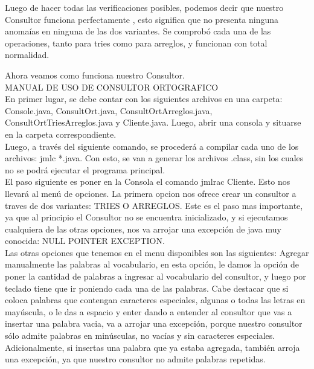 \documentclass{article}
\begin{document}
{	Luego de hacer todas las verificaciones posibles, podemos decir que nuestro Consultor funciona perfectamente , esto significa que no presenta ninguna anoma\'ias en ninguna de las dos variantes. Se comprob\'o cada una de las operaciones, tanto para tries como para arreglos, y funcionan con total normalidad.

Ahora veamos como funciona nuestro Consultor.\\

MANUAL DE USO DE CONSULTOR ORTOGRAFICO \\

    En primer lugar, se debe contar con los siguientes archivos en una carpeta: Console.java, ConsultOrt.java, ConsultOrtArreglos.java, ConsultOrtTriesArreglos.java y Cliente.java. Luego, abrir una consola y situarse en la carpeta correspondiente.\\

    Luego, a trav\'es del siguiente comando, se proceder\'a a compilar cada uno de los archivos: jmlc *.java. Con esto, se van a generar los archivos .class, sin los cuales no se podr\'a ejecutar el programa principal.\\

    El paso siguiente es poner en la Consola el comando jmlrac Cliente. Esto nos llevar\'a al men\'u de opciones. La primera opcion nos ofrece crear un consultor a traves de dos variantes: TRIES O ARREGLOS. Este es el paso mas importante, ya que al principio el Consultor no se encuentra inicializado, y si ejecutamos cualquiera de las otras opciones, nos va arrojar una excepci\'on de java muy conocida: NULL POINTER EXCEPTION.\\

    Las otras opciones que tenemos en el menu disponibles son las siguientes: Agregar manualmente las palabras al vocabulario, en esta opci\'on, le damos la opci\'on de poner la cantidad de palabras a ingresar al vocabulario del consultor, y luego por teclado tiene que ir poniendo cada una de las palabras. Cabe destacar que si coloca palabras que contengan caracteres especiales, algunas o todas las letras en may\'uscula, o le das a espacio y enter dando a entender al consultor que vas a insertar una palabra vacia, va a arrojar una excepci\'on, porque nuestro consultor s\'olo admite palabras en min\'usculas, no vac\'ias y sin caracteres especiales.
    Adicionalmente, si insertas una palabra que ya estaba agregada, tambi\'en arroja una excepci\'on, ya que nuestro consultor no admite palabras repetidas.\\

}
\end{document}
